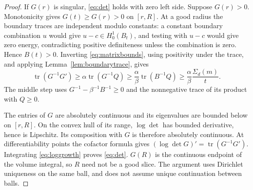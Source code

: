 \documentclass[11pt]{article}
\theoremstyle{remark}
\newcommand{\Tr}{\operatorname{tr}}
\begin{document}
\begin{proof}
If $G(r)$ is singular, \eqref{eq:det} holds with zero left side.
Suppose $G(r)>0$. Monotonicity gives $G(t)\ge G(r)>0$ on $[r,R]$.
At a good radius the boundary traces are independent modulo constants:
a constant boundary combination $u$ would give $u-c\in H^1_0(B_t)$,
and testing with $u-c$ would give zero energy, contradicting positive
definiteness unless the combination is zero. Hence $B(t)>0$.
Inverting \eqref{eq:matrixbounds}, using positivity under the trace,
and applying Lemma~\ref{lem:boundarytrace}, gives
\begin{equation}\label{eq:loggrowth}
 \Tr(G^{-1}G')\ge\alpha\Tr(G^{-1}Q)
       \ge\frac\alpha\beta\Tr(B^{-1}Q)
       \ge\frac\alpha\beta\frac{\Sigma_d(m)}t.
\end{equation}
The middle step uses $G^{-1}-\beta^{-1}B^{-1}\ge0$ and the nonnegative
trace of its product with $Q\ge0$.

The entries of $G$ are absolutely continuous and its eigenvalues are
bounded below on $[r,R]$. On the convex hull of its range, $\log\det$
has bounded derivative, hence is Lipschitz. Its composition with $G$
is therefore absolutely continuous. At differentiability points the
cofactor formula gives $(\log\det G)'=\Tr(G^{-1}G')$.
Integrating \eqref{eq:loggrowth} proves \eqref{eq:det}.
$G(R)$ is the continuous endpoint of the volume integral, so $R$ need
not be a good slice. The argument uses Dirichlet uniqueness on the
same ball, and does not assume unique continuation between balls.
\end{proof}
\end{document}
